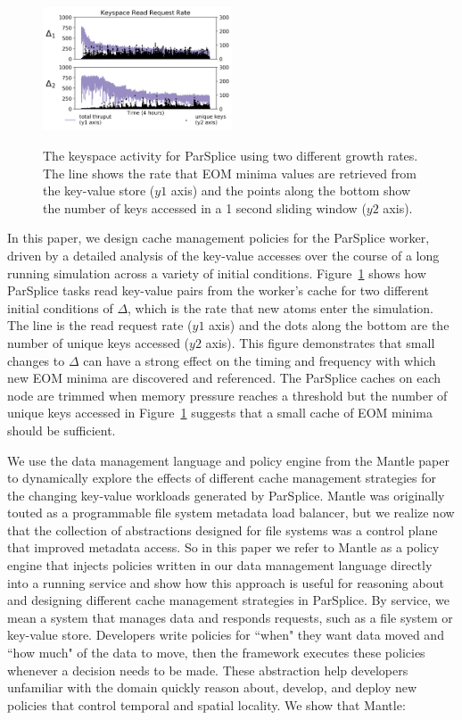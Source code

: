 \begin{figure}[t]
  \noindent\includegraphics[width=0.5\textwidth]{figures/motivation-regimes.png}\\
  \caption{The keyspace activity for ParSplice using two different growth
rates.  The line shows the rate that EOM minima values are retrieved from the
key-value store (\(y1\) axis) and the points along the bottom show the number
of keys accessed in a 1 second sliding window (\(y2\) axis).
\label{fig:motivation-regimes}}
\end{figure}

In this paper, we design cache management policies for the ParSplice worker,
driven by a detailed analysis of the key-value accesses over the course of a
long running simulation across a variety of initial conditions.
Figure~\ref{fig:motivation-regimes} shows how ParSplice tasks read key-value
pairs from the worker's cache for two different initial conditions of
\(\Delta\), which is the rate that new atoms enter the simulation.  The line is
the read request rate (\(y1\) axis) and the dots along the bottom are the
number of unique keys accessed (\(y2\) axis).  This figure demonstrates that
small changes to \(\Delta\) can have a strong effect on the timing and
frequency with which new EOM minima are discovered and referenced.  The
ParSplice caches on each node are trimmed when memory pressure reaches a
threshold but the number of unique keys accessed in
Figure~\ref{fig:motivation-regimes} suggests that a small cache of EOM minima
should be sufficient. 

We use the data management language and policy engine from the Mantle
paper~\cite{sevilla:sc15-mantle} to dynamically explore the effects of
different cache management strategies for the changing key-value workloads
generated by ParSplice.  Mantle was originally touted as a programmable file
system metadata load balancer, but we realize now that the collection of
abstractions designed for file systems was a control plane that improved
metadata access. So in this paper we refer to Mantle as a policy engine that
injects policies written in our data management language directly into a
running service and show how this approach is useful for reasoning about and
designing different cache management strategies in ParSplice.  By service, we
mean a system that manages data and responds requests, such as a file system or
key-value store.  Developers write policies for ``when" they want data moved
and ``how much" of the data to move, then the framework executes these policies
whenever a decision needs to be made.  These abstraction help developers
unfamiliar with the domain quickly reason about, develop, and deploy new
policies that control temporal and spatial locality. We show that Mantle:

